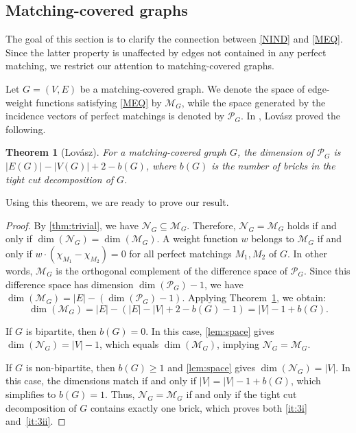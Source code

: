 \documentclass{article}
\theoremstyle{plain}
\newtheorem{thm}{Theorem}[section]
\theoremstyle{definition}
\newcommand{\cM}{\mathcal{M}}
\newcommand{\cN}{\mathcal{N}}
\newcommand{\cP}{\mathcal{P}}
\begin{document}
\subsection{Matching-covered graphs}
\label{sec:mcovered}

The goal of this section is to clarify the connection between \ref{NIND} and \ref{MEQ}. Since the latter property is unaffected by edges not contained in any perfect matching, we restrict our attention to matching-covered graphs. 

Let $G=(V,E)$ be a matching-covered graph. We denote the space of edge-weight functions satisfying \ref{MEQ} by $\mathcal{M}_G$, while the space generated by the incidence vectors of perfect matchings is denoted by $\cP_G$. In \cite{lovasz1987matching}, Lovász proved the following.

\begin{thm}[Lovász]\label{thm:lovasz}
    For a matching-covered graph $G$, the dimension of $\cP_G$ is $|E(G)|-|V(G)|+2-b(G)$, where $b(G)$ is the number of bricks in the tight cut decomposition of $G$. 
\end{thm}

Using this theorem, we are ready to prove our result.

\thmmainthird*

\begin{proof}
    By \cref{thm:trivial}, we have $\cN_G \subseteq \cM_G$. Therefore, $\cN_G = \cM_G$ holds if and only if $\dim(\cN_G) = \dim(\cM_G)$. A weight function $w$ belongs to $\cM_G$ if and only if $w \cdot (\chi_{M_1} - \chi_{M_2}) = 0$ for all perfect matchings $M_1, M_2$ of $G$. In other words, $\cM_G$ is the orthogonal complement of the difference space of $\cP_G$. Since this difference space has dimension $\dim(\cP_G) - 1$, we have $\dim(\cM_G) = |E| - (\dim(\cP_G) - 1)$. Applying Theorem~\ref{thm:lovasz}, we obtain:
    \[
        \dim(\cM_G) = |E| - (|E| - |V| + 2 - b(G) - 1) = |V| - 1 + b(G).
    \]
    
    If $G$ is bipartite, then $b(G) = 0$. In this case, \cref{lem:space} gives $\dim(\cN_G) = |V| - 1$, which equals $\dim(\cM_G)$, implying $\cN_G = \cM_G$.

    If $G$ is non-bipartite, then $b(G) \geq 1$ and \cref{lem:space} gives $\dim(\cN_G) = |V|$. In this case, the dimensions match if and only if $|V| = |V| - 1 + b(G)$, which simplifies to $b(G) = 1$. Thus, $\cN_G = \cM_G$ if and only if the tight cut decomposition of $G$ contains exactly one brick, which proves both \ref{it:3i} and~\ref{it:3ii}.
\end{proof}
\end{document}
